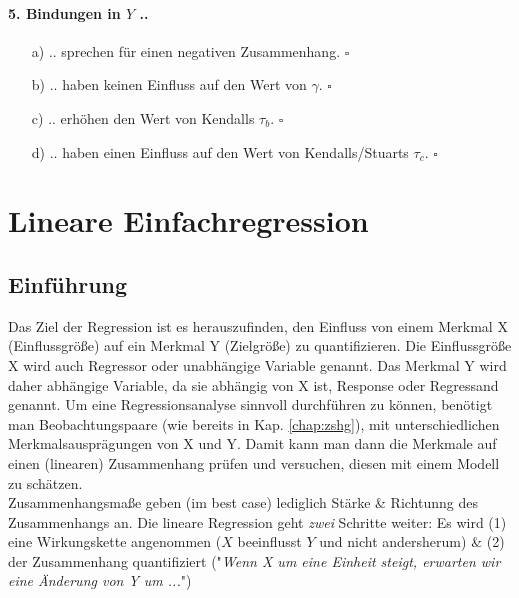 \documentclass[a4paper]{article}
\newcommand\dangersign{%
 \makebox[1.8em][c]{%
 \makebox[0pt][c]{\raisebox{.15em}{\small!}}%
 \makebox[0pt][c]{\color{red}\Large$\triangle$}}}%
\begin{document}
\paragraph{5. Bindungen in $Y$ ..}

\begin{itemize}
    \item[a)] .. sprechen für einen negativen Zusammenhang. \hfill $\square$
    \item[b)] .. haben keinen Einfluss auf den Wert von $\gamma$. \hfill $\square$
    \item[c)] .. erhöhen den Wert von Kendalls $\tau_b$. \hfill $\square$
    \item[d)] .. haben einen Einfluss auf den Wert von Kendalls/Stuarts $\tau_c$. \hfill $\square$
\end{itemize}


\clearpage


\section{Lineare Einfachregression}\label{chap:linreg}
\subsection{Einführung}
Das Ziel der Regression ist es herauszufinden, den Einfluss von einem Merkmal X (Einflussgröße) auf ein Merkmal Y (Zielgröße) zu quantifizieren. Die Einflussgröße X wird auch Regressor oder unabhängige Variable genannt. Das Merkmal Y wird daher abhängige Variable, da sie abhängig von X ist, Response oder Regressand genannt. Um eine Regressionsanalyse sinnvoll durchführen zu können, benötigt man Beobachtungspaare (wie bereits in Kap. \ref{chap:zshg}), mit unterschiedlichen Merkmalsausprägungen von X und Y. Damit kann man dann die Merkmale auf einen (linearen) Zusammenhang prüfen und versuchen, diesen mit einem Modell zu schätzen.\\

\noindent \dangersign Zusammenhangsmaße geben (im best case) lediglich Stärke \& Richtunng des Zusammenhangs an. Die lineare Regression geht \textit{zwei} Schritte weiter: Es wird (1) eine Wirkungskette angenommen ($X$ beeinflusst $Y$ und nicht andersherum) \& (2) der Zusammenhang quantifiziert ("\textit{Wenn X um eine Einheit steigt, erwarten wir eine Änderung von Y um ...}")\\
\end{document}
